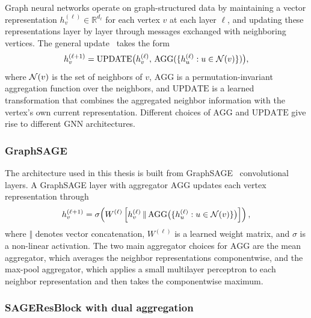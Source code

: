 Graph neural networks operate on graph-structured data by
maintaining a vector representation $h_v^{(\ell)} \in
\mathbb{R}^{d_\ell}$ for each vertex $v$ at each layer $\ell$, and
updating these representations layer by layer through messages
exchanged with neighboring vertices. The general
update~\cite{hamilton2017inductive, kipf2017semi} takes the form
\begin{equation}
    h_v^{(\ell+1)} = \mathrm{UPDATE}\bigl( h_v^{(\ell)}, \,
    \mathrm{AGG}(\{h_u^{(\ell)} : u \in \mathcal{N}(v)\}) \bigr),
    \label{eq:message_passing}
\end{equation}
where $\mathcal{N}(v)$ is the set of neighbors of $v$, $\mathrm{AGG}$ is
a permutation-invariant aggregation function over the neighbors,
and $\mathrm{UPDATE}$ is a learned transformation that combines the
aggregated neighbor information with the vertex's own current
representation. Different choices of $\mathrm{AGG}$ and
$\mathrm{UPDATE}$ give rise to different GNN architectures.


\subsubsection{GraphSAGE}
\label{sec:method_sage}

The architecture used in this thesis is built from
GraphSAGE~\cite{hamilton2017inductive} convolutional layers. A
GraphSAGE layer with aggregator $\mathrm{AGG}$ updates each vertex
representation through
\begin{equation}
    h_v^{(\ell+1)} = \sigma\!\left( W^{(\ell)} \left[
    h_v^{(\ell)} \,\Vert\, \mathrm{AGG}\bigl( \{ h_u^{(\ell)} : u
    \in \mathcal{N}(v) \} \bigr) \right] \right),
    \label{eq:sage_update}
\end{equation}
where $\Vert$ denotes vector concatenation, $W^{(\ell)}$ is a
learned weight matrix, and $\sigma$ is a non-linear activation. The
two main aggregator choices for $\mathrm{AGG}$ are the mean
aggregator, which averages the neighbor representations
componentwise, and the max-pool aggregator, which applies a small
multilayer perceptron to each neighbor representation and then
takes the componentwise maximum.


\subsubsection{SAGEResBlock with dual aggregation}
\label{sec:method_resblock}

